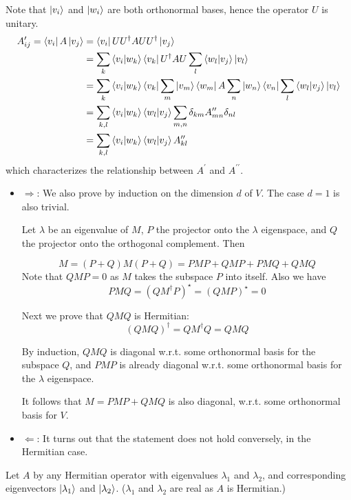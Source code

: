 \documentclass{homeworg}
\begin{document}
Note that $\ket{v_i}$ and $\ket{w_i}$ are both orthonormal bases, hence the operator $U$ is unitary.
\begin{align}
    A_{ij}^\prime=\bra{v_i}A\ket{v_j}&=\bra{v_i}U U^\dagger AU U^\dagger\ket{v_j}\nonumber\\
    &=\sum_k\braket{v_i|w_k}\bra{v_k} U^\dagger AU \sum_l\braket{w_l|v_j}\ket{v_l}\nonumber\\
    &=\sum_k\braket{v_i|w_k}\bra{v_k} \sum_m \ket{v_m}\bra{w_m} A \sum_n\ket{w_n}\bra{v_n} \sum_l\braket{w_l|v_j}\ket{v_l}\nonumber\\
    &=\sum_{k,l}\braket{v_i|w_k}\braket{w_l|v_j} \sum_{m,n} \delta_{km}A_{mn}^{\prime\prime} \delta_{nl}\nonumber\\
    &=\sum_{k,l}\braket{v_i|w_k}\braket{w_l|v_j} A_{kl}^{\prime\prime} \nonumber
\end{align}
which characterizes the relationship between $A^\prime$ and $A^{\prime\prime}$.

\exercise*
\begin{itemize}
    \item $\Rightarrow$:
    We also prove by induction on the dimension $d$ of $V$. The case $d=1$ is also trivial.
    
    Let $\lambda$ be an eigenvalue of $M$, $P$ the projector onto the $\lambda$ eigenspace, and $Q$ the projector onto the orthogonal complement. Then
    
    \[M=(P+Q)M(P+Q)=PMP+QMP+PMQ+QMQ\]
    Note that $QMP=0$ as $M$ takes the subspace $P$ into itself. Also we have
    \[PMQ=(Q M^\dagger P)^\star=(Q M P)^\star=0\]
    
    Next we prove that $QMQ$ is Hermitian:
    \[(QMQ)^\dagger=QM^\dagger Q=QMQ\]
    
    By induction, $QMQ$ is diagonal w.r.t. some orthonormal basis for the subspace $Q$, and $PMP$ is already diagonal w.r.t. some orthonormal basis for the $\lambda$ eigenspace.
    
    It follows that $M=PMP+QMQ$ is also diagonal, w.r.t. some orthonormal basis for $V$.
    
    \item $\Leftarrow$: It turns out that the statement does not hold conversely, in the Hermitian case.
    
\end{itemize}

\exercise*
Let $A$ by any Hermitian operator with eigenvalues $\lambda_1$ and $\lambda_2$, and corresponding eigenvectors $\ket{\lambda_1}$ and $\ket{\lambda_2}$. ($\lambda_1$ and $\lambda_2$ are real as $A$ is Hermitian.)
\end{document}
